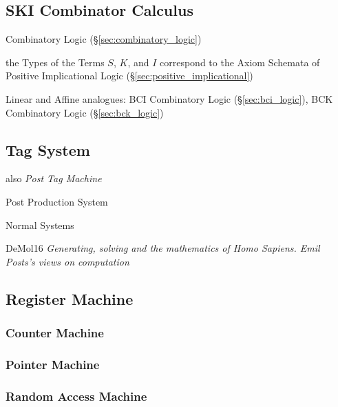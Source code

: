 \subsection{SKI Combinator Calculus}\label{sec:ski_calculus}

Combinatory Logic (\S\ref{sec:combinatory_logic})

the Types of the Terms $S$, $K$, and $I$ correspond to the Axiom
Schemata of Positive Implicational Logic
(\S\ref{sec:positive_implicational})

Linear and Affine analogues: BCI Combinatory Logic
(\S\ref{sec:bci_logic}), BCK Combinatory Logic (\S\ref{sec:bck_logic})



\subsection{Tag System}\label{sec:tag_system}

also \emph{Post Tag Machine}

Post Production System %

Normal Systems

DeMol16 \emph{Generating, solving and the mathematics of Homo Sapiens.
  Emil Posts's views on computation}



\subsection{Register Machine}\label{sec:register_machine}

\subsubsection{Counter Machine}

\subsubsection{Pointer Machine}

\subsubsection{Random Access Machine}

